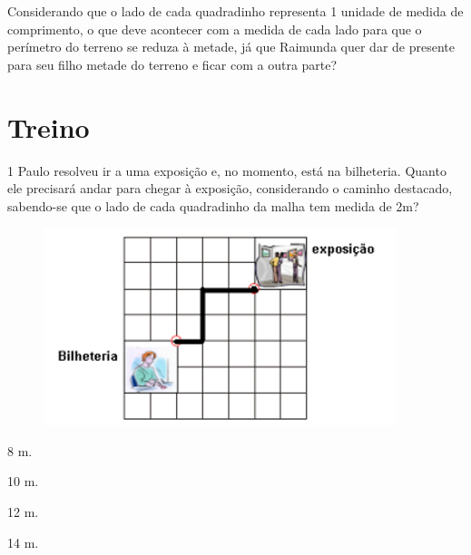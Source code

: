Considerando que o lado de cada quadradinho representa 1 unidade de
medida de comprimento, o que deve acontecer com a medida de cada lado
para que o perímetro do terreno se reduza à metade, já que Raimunda quer
dar de presente para seu filho metade do terreno e ficar com a outra
parte?

\begin{mdframed}[linewidth=2pt,linecolor=salmao]
\mbox{}\vspace*{6cm}
\end{mdframed}

\pagebreak
\section*{Treino}

\num{1} Paulo resolveu ir a uma exposição e, no momento, está na bilheteria. Quanto ele precisará andar para chegar à exposição,
considerando o caminho destacado, sabendo-se que o lado de cada quadradinho da malha tem medida de 2m?

\begin{figure}[htpb!]
\centering
\includegraphics[width=\textwidth]{./imgs/mat8.png}
\end{figure}

\begin{minipage}{.5\textwidth}
\begin{escolha}
\item
  8 m.
\item
  10 m.
\item
  12 m.
\item
  14 m.
\end{escolha}
\end{minipage}


